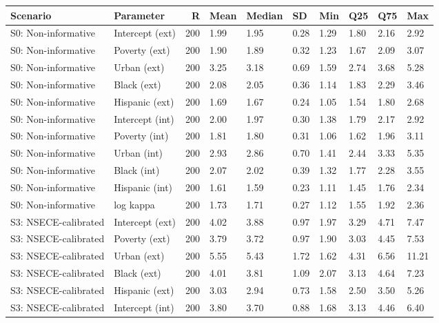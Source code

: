 \begin{table}[htbp]
\centering
\begin{tabular}{llrlllllll}
  \toprule
Scenario & Parameter & R & Mean & Median & SD & Min & Q25 & Q75 & Max \\ 
  \midrule
S0: Non-informative & Intercept (ext) & 200 & 1.99 & 1.95 & 0.28 & 1.29 & 1.80 & 2.16 & 2.92 \\ 
  S0: Non-informative & Poverty (ext) & 200 & 1.90 & 1.89 & 0.32 & 1.23 & 1.67 & 2.09 & 3.07 \\ 
  S0: Non-informative & Urban (ext) & 200 & 3.25 & 3.18 & 0.69 & 1.59 & 2.74 & 3.68 & 5.28 \\ 
  S0: Non-informative & Black (ext) & 200 & 2.08 & 2.05 & 0.36 & 1.14 & 1.83 & 2.29 & 3.46 \\ 
  S0: Non-informative & Hispanic (ext) & 200 & 1.69 & 1.67 & 0.24 & 1.05 & 1.54 & 1.80 & 2.68 \\ 
  S0: Non-informative & Intercept (int) & 200 & 2.00 & 1.97 & 0.30 & 1.38 & 1.79 & 2.17 & 2.92 \\ 
  S0: Non-informative & Poverty (int) & 200 & 1.81 & 1.80 & 0.31 & 1.06 & 1.62 & 1.96 & 3.11 \\ 
  S0: Non-informative & Urban (int) & 200 & 2.93 & 2.86 & 0.70 & 1.41 & 2.44 & 3.33 & 5.35 \\ 
  S0: Non-informative & Black (int) & 200 & 2.07 & 2.02 & 0.39 & 1.32 & 1.77 & 2.28 & 3.55 \\ 
  S0: Non-informative & Hispanic (int) & 200 & 1.61 & 1.59 & 0.23 & 1.11 & 1.45 & 1.76 & 2.34 \\ 
  S0: Non-informative & log kappa & 200 & 1.73 & 1.71 & 0.27 & 1.12 & 1.55 & 1.92 & 2.36 \\ 
  S3: NSECE-calibrated & Intercept (ext) & 200 & 4.02 & 3.88 & 0.97 & 1.97 & 3.29 & 4.71 & 7.47 \\ 
  S3: NSECE-calibrated & Poverty (ext) & 200 & 3.79 & 3.72 & 0.97 & 1.90 & 3.03 & 4.45 & 7.53 \\ 
  S3: NSECE-calibrated & Urban (ext) & 200 & 5.55 & 5.43 & 1.72 & 1.62 & 4.31 & 6.56 & 11.21 \\ 
  S3: NSECE-calibrated & Black (ext) & 200 & 4.01 & 3.81 & 1.09 & 2.07 & 3.13 & 4.64 & 7.23 \\ 
  S3: NSECE-calibrated & Hispanic (ext) & 200 & 3.03 & 2.94 & 0.73 & 1.58 & 2.50 & 3.50 & 5.26 \\ 
  S3: NSECE-calibrated & Intercept (int) & 200 & 3.80 & 3.70 & 0.88 & 1.68 & 3.13 & 4.46 & 6.40 \\ 

\end{tabular}
\end{table}
